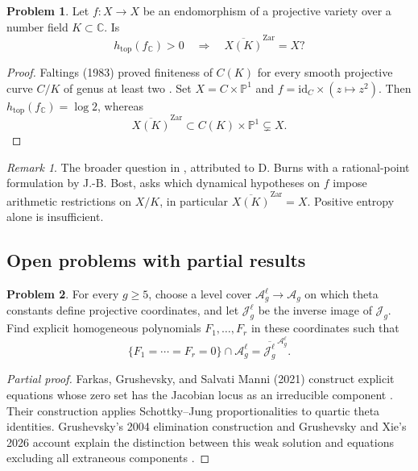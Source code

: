 \documentclass[11pt,reqno]{amsart}
\theoremstyle{definition}
\newtheorem{problem}{Problem}[section]
\theoremstyle{remark}
\newtheorem*{remark}{Remark}
\begin{document}
\begin{problem}\label{FS-2.27}
Let $f:X\to X$ be an endomorphism of a projective variety over a number field $K\subset\mathbb C$. Is
\[
h_{\mathrm{top}}(f_{\mathbb C})>0\quad\Longrightarrow\quad
\overline{X(K)}^{\mathrm{Zar}}=X?
\]
\end{problem}
\begin{proof}
Faltings (1983) proved finiteness of $C(K)$ for every smooth projective curve $C/K$ of genus at least two \cite{FS-Faltings}. Set $X=C\times\mathbb P^1$ and $f=\mathrm{id}_C\times(z\mapsto z^2)$. Then $h_{\mathrm{top}}(f_{\mathbb C})=\log2$, whereas
\[
\overline{X(K)}^{\mathrm{Zar}}\subset C(K)\times\mathbb P^1\subsetneq X.
\]
\end{proof}
\begin{remark}
The broader question in \cite[Question~2.27]{FS2001}, attributed to D. Burns with a rational-point formulation by J.-B. Bost, asks which dynamical hypotheses on $f$ impose arithmetic restrictions on $X/K$, in particular $\overline{X(K)}^{\mathrm{Zar}}=X$. Positive entropy alone is insufficient.
\end{remark}

\subsection{Open problems with partial results}

\begin{problem}\label{Siu-4.2}
For every $g\geq5$, choose a level cover $\mathcal A_g^{\ell}\to\mathcal A_g$ on which theta constants define projective coordinates, and let $\mathcal J_g^{\ell}$ be the inverse image of $\mathcal J_g$. Find explicit homogeneous polynomials $F_1,\ldots,F_r$ in these coordinates such that
\[
\{F_1=\cdots=F_r=0\}\cap\mathcal A_g^{\ell}
=\overline{\mathcal J_g^{\ell}}^{\,\mathcal A_g^{\ell}}.
\]
\end{problem}
\begin{proof}[Partial proof]
Farkas, Grushevsky, and Salvati Manni (2021) construct explicit equations whose zero set has the Jacobian locus as an irreducible component \cite{SIU-FGS21}. Their construction applies Schottky--Jung proportionalities to quartic theta identities. Grushevsky's 2004 elimination construction and Grushevsky and Xie's 2026 account explain the distinction between this weak solution and equations excluding all extraneous components \cite{SIU-Gru04,SIU-GX26}.
\end{proof}
\end{document}
